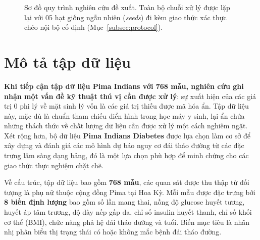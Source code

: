 \documentclass[14pt,a4paper]{extreport}
\begin{document}
\begin{figure}[htbp]
  \centering
  \caption{Sơ đồ quy trình nghiên cứu đề xuất. Toàn bộ chuỗi xử lý được lặp lại với 05 hạt giống ngẫu nhiên (\textit{seeds}) đi kèm giao thức xác thực chéo nội bộ cố định (Mục~\ref{subsec:protocol}).}
  \label{fig:pipeline}
\end{figure}

\section{Mô tả tập dữ liệu}
\label{subsec:dataset}

\textbf{Khi tiếp cận tập dữ liệu Pima Indians với 768 mẫu, nghiên cứu ghi nhận một vấn đề kỹ thuật thú vị cần được xử lý}: sự xuất hiện của các giá trị 0 phi lý về mặt sinh lý vốn là các giá trị thiếu được mã hóa ẩn. Tập dữ liệu này, mặc dù là chuẩn tham chiếu điển hình trong học máy y sinh, lại ẩn chứa những thách thức về chất lượng dữ liệu cần được xử lý một cách nghiêm ngặt. Xét rộng hơn, bộ dữ liệu \textbf{Pima Indians Diabetes} được lựa chọn làm cơ sở để xây dựng và đánh giá các mô hình dự báo nguy cơ đái tháo đường từ các đặc trưng lâm sàng dạng bảng, đó là một lựa chọn phù hợp để minh chứng cho các giao thức thực nghiệm chặt chẽ.\cite{smith1988,uci-pima}

Về cấu trúc, tập dữ liệu bao gồm \textbf{768 mẫu}, các quan sát được thu thập từ đối tượng là phụ nữ thuộc cộng đồng Pima tại Hoa Kỳ.\cite{smith1988} Mỗi mẫu được đặc trưng bởi \textbf{8 biến định lượng} bao gồm số lần mang thai, nồng độ glucose huyết tương, huyết áp tâm trương, độ dày nếp gấp da, chỉ số insulin huyết thanh, chỉ số khối cơ thể (BMI), chức năng phả hệ đái tháo đường và tuổi. Biến mục tiêu là nhãn nhị phân biểu thị trạng thái có hoặc không mắc bệnh đái tháo đường.
\end{document}
